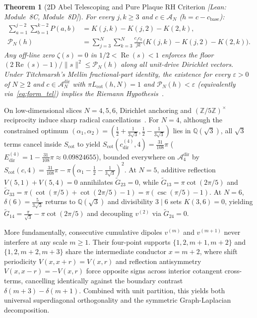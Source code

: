 \documentclass[10pt,a4paper]{article}
\newtheorem{theorem}{Theorem}[section]
\theoremstyle{definition}
\begin{document}
\begin{theorem}[2D Abel Telescoping and Pure Plaque RH Criterion \emph{[Lean: Module~8C, Module~8D]}]\label{thm:telescoping}
For every $j,k \ge 3$ and $c \in \mathcal{A}_N$ ($h = c - c_{\mathrm{base}}$):
\begin{align}\label{eq:form_tel}
\sum_{a=1}^{j-2}\sum_{b=1}^{k-2} P(a,b) &= K(j,k) - K(j,2) - K(2,k), \\
\mathcal{P}_N(h) &= \sum_{j=3}^N \sum_{k=3}^N \frac{c_j c_k}{jk} \bigl(K(j,k) - K(j,2) - K(2,k)\bigr). \nonumber
\end{align}
Any off-line zero $\zeta(s) = 0$ in $1/2 < \operatorname{Re}(s) < 1$ enforces the floor $(2\operatorname{Re}(s) - 1)/\|s\|^2 \le \mathcal{P}_N(h)$ along all unit-drive Dirichlet vectors. Under Titchmarsh's Mellin fractional-part identity, the existence for every $\varepsilon > 0$ of $N \ge 2$ and $c \in \mathcal{A}_N^{\mathrm{dir}}$ with $\pi L_{\mathrm{cot}}(h, N) = 1$ and $\mathcal{P}_N(h) < \varepsilon$ (equivalently via~\eqref{eq:form_tel}) implies the Riemann Hypothesis~\cite{Bagchi2006,Weingartner2007}.
\end{theorem}

On low-dimensional slices $N = 4, 5, 6$, Dirichlet anchoring and $(\mathbb{Z}/5\mathbb{Z})^\times$ reciprocity induce sharp radical cancellations~\cite{BettinConrey2013,MaierRassias2016}. For $N=4$, although the constrained optimum $(\alpha_1, \alpha_2) = (\tfrac{1}{2}+\tfrac{1}{3\sqrt{3}}, \tfrac{1}{2}-\tfrac{1}{3\sqrt{3}})$ lies in $\mathbb{Q}(\sqrt{3})$, all $\sqrt{3}$ terms cancel inside $S_{\mathrm{cot}}$ to yield $S_{\mathrm{cot}}(c_{\mathrm{dir}}^{(4)}, 4) = \frac{31}{108}\pi$ ($E_{\mathrm{dir}}^{(4)} = 1 - \frac{31}{108}\pi \approx 0.09824655$), bounded everywhere on $\mathcal{A}_4^{\mathrm{dir}}$ by $S_{\mathrm{cot}}(c,4) = \frac{31}{108}\pi - \pi(\alpha_1 - \tfrac{1}{2}-\tfrac{1}{3\sqrt{3}})^2$. At $N=5$, additive reflection $V(5,1)+V(5,4)=0$ annihilates $\widetilde{G}_{23} = 0$, while $\widetilde{G}_{13} = \pi\cot(2\pi/5)$ and $\widetilde{G}_{33} = \pi(\cot(\pi/5)+\cot(2\pi/5)-1) = \pi(\csc(\pi/5) - 1)$. At $N=6$, $\delta(6) = \tfrac{5}{3\sqrt{3}}$ returns to $\mathbb{Q}(\sqrt{3})$ and divisibility $3 \mid 6$ sets $K(3,6) = 0$, yielding $\widetilde{G}_{14} = \tfrac{\pi}{\sqrt{3}} - \pi\cot(2\pi/5)$ and decoupling $v^{(2)}$ via $\widetilde{G}_{24} = 0$.

More fundamentally, consecutive cumulative dipoles $v^{(m)}$ and $v^{(m+1)}$ never interfere at any scale $m \ge 1$. Their four-point supports $\{1, 2, m+1, m+2\}$ and $\{1, 2, m+2, m+3\}$ share the intermediate conductor $x = m+2$, where shift periodicity $V(x, x+r) = V(x, r)$ and reflection antisymmetry $V(x, x-r) = -V(x, r)$ force opposite signs across interior cotangent cross-terms, cancelling identically against the boundary contrast $\delta(m+3)-\delta(m+1)$. Combined with unit partition, this yields both universal superdiagonal orthogonality and the symmetric Graph-Laplacian decomposition.
\end{document}
